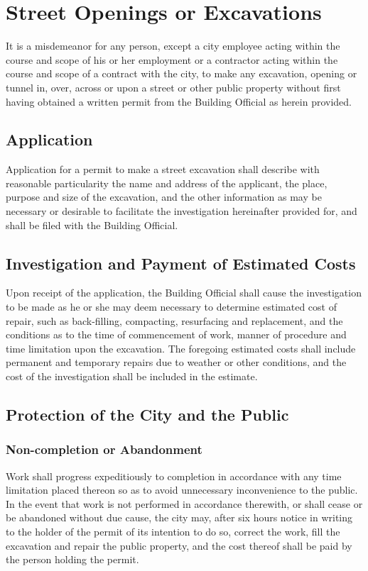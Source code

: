 \section{Street Openings or Excavations}
It is a misdemeanor for any person, except a city employee acting within the course and scope of his or her employment or a contractor acting within the course and scope of a contract with the city, to make any excavation, opening or tunnel in, over, across or upon a street or other public property without first having obtained a written permit from the Building Official as herein provided.
\subsection{Application}
Application for a permit to make a street excavation shall describe with reasonable particularity the name and address of the applicant, the place, purpose and size of the excavation, and the other information as may be necessary or desirable to facilitate the investigation hereinafter provided for, and shall be filed with the Building Official.
\subsection{Investigation and Payment of Estimated Costs}
Upon receipt of the application, the Building Official shall cause the investigation to be made as he or she may deem necessary to determine estimated cost of repair, such as back-filling, compacting, resurfacing and replacement, and the conditions as to the time of commencement of work, manner of procedure and time limitation upon the excavation.  The foregoing estimated costs shall include permanent and temporary repairs due to weather or other conditions, and the cost of the investigation shall be included in the estimate.
\subsection{Protection of the City and the Public}
\subsubsection{Non-completion or Abandonment}
Work shall progress expeditiously to completion in accordance with any time limitation placed thereon so as to avoid unnecessary inconvenience to the public.  In the event that work is not performed in accordance therewith, or shall cease or be abandoned without due cause, the city may, after six hours notice in writing to the holder of the permit of its intention to do so, correct the work, fill the excavation and repair the public property, and the cost thereof shall be paid by the person holding the permit.
